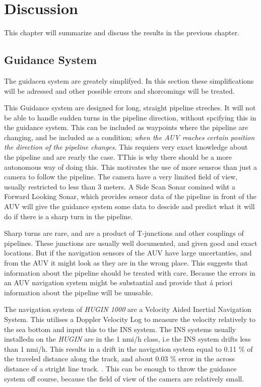 \chapter{Discussion}
	This chapter will summarize and discuss the results in the previous chapter.

\section{Guidance System}
	The guidacen system are greately simplifyed. In this section these simplifications will be adressed
	and other possible errors and shorcomings will be treated. 

	This Guidance system are designed for long, straight pipeline streches. It will not be able to handle
	sudden turns in the pipeline direction, without spcifying this in the guidance system. This can be
	included as waypoints where the pipeline are changing, and be included as a condition; \textit{when the AUV
	reaches certain position the direction of the pipeline changes}. This requiers very exact knowledge
	about the pipeline and are rearly the case. TThis is why there should be a more autonomous way of
	doing this. This motivates the use of more sensros than just a camera to follow the pipeline. The
	camera have a very limited field of view, usually restricted to less than 3 meters. A Side Scan Sonar
	comined wiht a Forward Looking Sonar, which provides sensor data of the pipeline in front of the AUV
	will give the guidance system some data to descide and predict what it will do if there is a sharp
	turn in the pipeline. 

	Sharp turns are rare, and are a product of T-junctions and other couplings of pipelines. These
	junctions are usually well documented, and given good and exact locations. But if the navigation
	sensors of the AUV have large uncertanties, and from the AUV it might look as they are in the wrong
	place. This suggests that information about the pipeline should be treated with care. Because the
	errors in an AUV navigation system might be substantial and provide that \'a priori information about
	the pipeline will be unusable. 

	The navigation system of \textit{HUGIN 1000} are a Velocity Aided Inertial Navigation System. This
	utilises a Doppler Velocity Log to measure the velocity relatively to the sea bottom and input this to
	the INS system. The INS systems usually installedn on the \textit{HUGIN} are in the 1 nmi/h class, i.e
	the INS system drifts less than 1 nmi/h. This results in a drift in the navigation system equal to
	0.11 \% of the traveled distance along the track, and about 0.03 \% error in the across distance of a
	stright line track. \cite{INS_Hugin}. This can be enough to throw the guidance system off course,
	because the field of view of the camera are relatively small.


